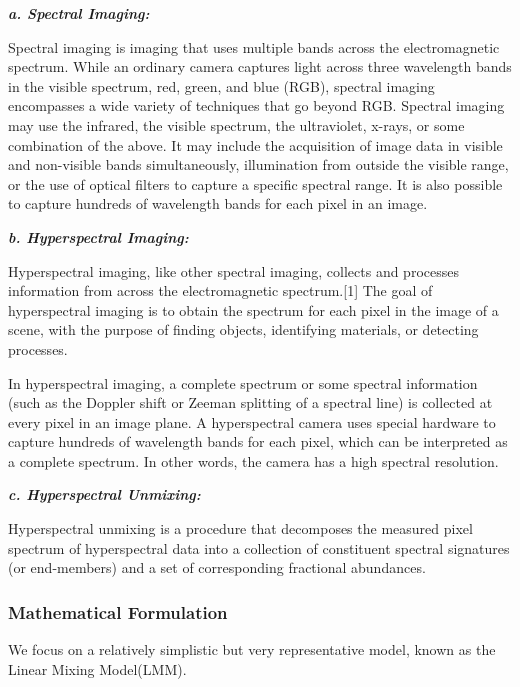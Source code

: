 \documentclass[fleqn, 11pt]{article}
\begin{document}
\textbf{\textit{a. Spectral Imaging: }}

\smallskip

Spectral imaging is imaging that uses multiple bands across the electromagnetic spectrum. While an ordinary camera captures light across three wavelength bands in the visible spectrum, red, green, and blue (RGB), spectral imaging encompasses a wide variety of techniques that go beyond RGB. Spectral imaging may use the infrared, the visible spectrum, the ultraviolet, x-rays, or some combination of the above. It may include the acquisition of image data in visible and non-visible bands simultaneously, illumination from outside the visible range, or the use of optical filters to capture a specific spectral range. It is also possible to capture hundreds of wavelength bands for each pixel in an image.

\medskip

\textbf{\textit{b. Hyperspectral Imaging:}}

\smallskip

Hyperspectral imaging, like other spectral imaging, collects and processes information from across the electromagnetic spectrum.[1] The goal of hyperspectral imaging is to obtain the spectrum for each pixel in the image of a scene, with the purpose of finding objects, identifying materials, or detecting processes.

In hyperspectral imaging, a complete spectrum or some spectral information (such as the Doppler shift or Zeeman splitting of a spectral line) is collected at every pixel in an image plane. A hyperspectral camera uses special hardware to capture hundreds of wavelength bands for each pixel, which can be interpreted as a complete spectrum. In other words, the camera has a high spectral resolution.

\medskip

\textbf{\textit{c. Hyperspectral Unmixing:}}

\smallskip

Hyperspectral unmixing is
a procedure that decomposes the measured pixel spectrum
of hyperspectral data into a collection of constituent spectral
signatures (or end-members) and a set of corresponding fractional abundances.

\subsubsection*{Mathematical Formulation}

We focus on a relatively simplistic but very representative
model, known as the Linear Mixing Model(LMM). 
\end{document}
